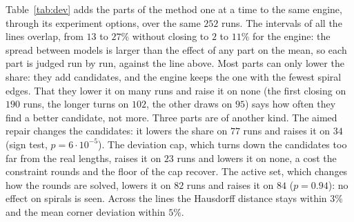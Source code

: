 \documentclass[11pt,a4paper]{article}
\begin{document}
Table~\ref{tab:dev} adds the parts of the method one at a time to the same
engine, through its experiment options, over the same $252$ runs. The
intervals of all the lines overlap, from $13$ to $27\%$ without closing to
$2$ to $11\%$ for the engine: the spread between models is larger than the
effect of any part on the mean, so each part is judged run by run, against
the line above. Most parts can only lower the share: they add candidates,
and the engine keeps the one with the fewest spiral edges. That they lower
it on many runs and raise it on none (the first closing on $190$ runs, the
longer turns on $102$, the other draws on $95$) says how often they find a
better candidate, not more. Three parts are of another kind. The aimed repair
changes the candidates: it lowers the share on $77$ runs and raises it on
$34$ (sign test, $p = 6 \cdot 10^{-5}$). The deviation cap, which turns down
the candidates too far from the real lengths, raises it on $23$ runs and
lowers it on none, a cost the constraint rounds and the floor of the cap
recover. The active set, which changes how the rounds are solved, lowers it
on $82$ runs and raises it on $84$ ($p = 0.94$): no effect on spirals is
seen. Across the lines the Hausdorff distance stays within $3\%$ and the
mean corner deviation within $5\%$.
\end{document}

